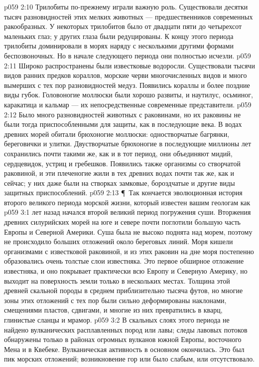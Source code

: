 \vs p059 2:10 Трилобиты по\hyp{}прежнему играли важную роль. Существовали десятки тысяч разновидностей этих мелких животных --- предшественников современных ракообразных. У некоторых трилобитов было от двадцати пяти до четырехсот маленьких глаз; у других глаза были редуцированы. К концу этого периода трилобиты доминировали в морях наряду с несколькими другими формами беспозвоночных. Но в начале следующего периода они полностью исчезли.
\vs p059 2:11 Широко распространены были известковые водоросли. Существовали тысячи видов ранних предков кораллов, морские черви многочисленных видов и много вымерших с тех пор разновидностей медуз. Появились кораллы и более поздние виды губок. Головоногие моллюски были хорошо развиты, и наутилус, осьминог, каракатица и кальмар --- их непосредственные современные представители.
\vs p059 2:12 Было много разновидностей животных с раковинами, но их раковины не были тогда приспособленными для защиты, как в последующие века. В водах древних морей обитали брюхоногие моллюски: одностворчатые багрянки, береговички и улитки. Двустворчатые брюхоногие в последующие миллионы лет сохранились почти такими же, как и в тот период, они объединяют мидий, сердцевидок, устриц и гребешков. Появились также организмы со створчатой раковиной, и эти плеченогие жили в тех древних водах почти так же, как и сейчас; у них даже были на створках замковые, бороздчатые и другие виды защитных приспособлений.
\vs p059 2:13 \P\ Так кончается эволюционная история второго великого периода морской жизни, который известен вашим геологам как 
\vs p059 3:1  лет назад начался второй великий период погружения суши. Вторжения древних силурийских морей на юге и севере почти поглотили большую часть Европы и Северной Америки. Суша была не высоко поднята над морем, поэтому не происходило больших отложений около береговых линий. Моря кишели организмами с известковой раковиной, и из этих раковин на дне моря постепенно образовались очень толстые слои известняка. Это первое обширное отложение известняка, и оно покрывает практически всю Европу и Северную Америку, но выходит на поверхность земли только в нескольких местах. Толщина этой древней скальной породы в среднем приблизительно тысяча футов, но многие зоны этих отложений с тех пор были сильно деформированы наклонами, смещениями пластов, сдвигами, и многие из них превратились в кварц, глинистые сланцы и мрамор.
\vs p059 3:2 В скальных слоях этого периода не найдено вулканических расплавленных пород или лавы; следы лавовых потоков обнаружены только в районах огромных вулканов южной Европы, восточного Мена и в Квебеке. Вулканическая активность в основном окончилась. Это был пик морских отложений; возникновение гор или было слабым, или отсутствовало.
